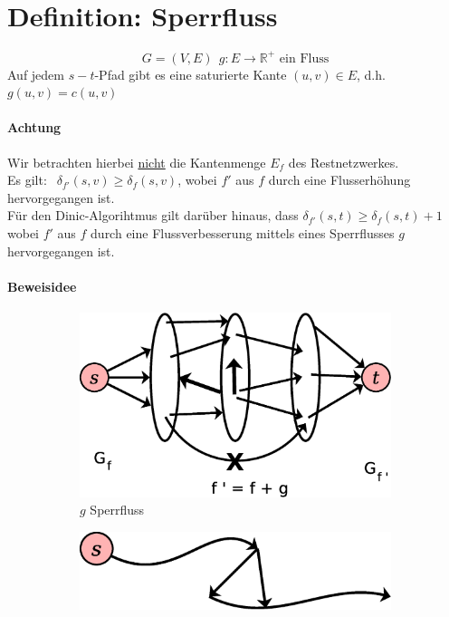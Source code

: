 \section{Definition: Sperrfluss}
\[ G=(V,E)~~g:E\rightarrow\mathbb{R}^+\text{ ein Fluss} \]
Auf jedem $s-t$-Pfad gibt es eine saturierte Kante $(u,v)\in E$, d.h. $g(u,v)=c(u,v)$
\paragraph{Achtung}
Wir betrachten hierbei \underline{nicht} die Kantenmenge $E_f$ des Restnetzwerkes.\\
Es gilt: $~~\delta_{f'}(s,v)\geq \delta_f(s,v)$, wobei $f'$ aus $f$ durch eine Flusserhöhung hervorgegangen ist.\\
Für den Dinic-Algorihtmus gilt darüber hinaus, dass $\delta_{f'}(s,t) \geq \delta_f(s,t)+1$ wobei $f'$ aus $f$ durch eine Flussverbesserung mittels eines Sperrflusses $g$ hervorgegangen ist.
\pagebreak
\paragraph{Beweisidee}
\begin{figure}[h]
\centering
\begin{subfigure}[H]{0.4\linewidth}
	\centering
\includegraphics[width=\linewidth]{27/Grafik/Diagramm2}
\caption{$g$ Sperrfluss}
\label{fig:Diagramm2}
\end{subfigure}
\hspace*{60pt}
\begin{subfigure}[H]{0.4\linewidth}
	\centering
	\includegraphics[width=\linewidth]{27/Grafik/Diagramm3}
	\caption{}
	\label{fig:Diagramm3}
\end{subfigure}
\end{figure}
